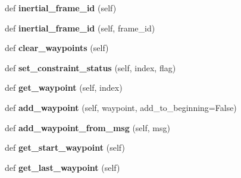 \begin{DoxyCompactItemize}
def {\bfseries inertial\+\_\+frame\+\_\+id} (self)
\item 
\mbox{\label{classuuv__waypoints_1_1waypoint__set_1_1WaypointSet_a24fad5bc9eef10bf3e565a67d5ef20df}} 
def {\bfseries inertial\+\_\+frame\+\_\+id} (self, frame\+\_\+id)
\item 
\mbox{\label{classuuv__waypoints_1_1waypoint__set_1_1WaypointSet_ae48c2c0d7301e44feb27e27dfa7d7f02}} 
def {\bfseries clear\+\_\+waypoints} (self)
\item 
\mbox{\label{classuuv__waypoints_1_1waypoint__set_1_1WaypointSet_a3e7dd0844b1454cb8474c0943e81d909}} 
def {\bfseries set\+\_\+constraint\+\_\+status} (self, index, flag)
\item 
\mbox{\label{classuuv__waypoints_1_1waypoint__set_1_1WaypointSet_a6f421eedec8d98624a76817892d10574}} 
def {\bfseries get\+\_\+waypoint} (self, index)
\item 
\mbox{\label{classuuv__waypoints_1_1waypoint__set_1_1WaypointSet_ab6eb2bbef0cc3b78be7570e4d1394063}} 
def {\bfseries add\+\_\+waypoint} (self, waypoint, add\+\_\+to\+\_\+beginning=False)
\item 
\mbox{\label{classuuv__waypoints_1_1waypoint__set_1_1WaypointSet_ad9cc151d2c3ecae858b016d4daf7fa03}} 
def {\bfseries add\+\_\+waypoint\+\_\+from\+\_\+msg} (self, msg)
\item 
\mbox{\label{classuuv__waypoints_1_1waypoint__set_1_1WaypointSet_ad74bb59a23450f939e7a9dab156e103a}} 
def {\bfseries get\+\_\+start\+\_\+waypoint} (self)
\item 
\mbox{\label{classuuv__waypoints_1_1waypoint__set_1_1WaypointSet_afc19b906ad568a6afb25df6764c22f33}} 
def {\bfseries get\+\_\+last\+\_\+waypoint} (self)
\item 
\mbox{\label{classuuv__waypoints_1_1waypoint__set_1_1WaypointSet_a399211f8ce8b307e24f36cc1ce4c9aca}} 

\end{DoxyCompactItemize}

